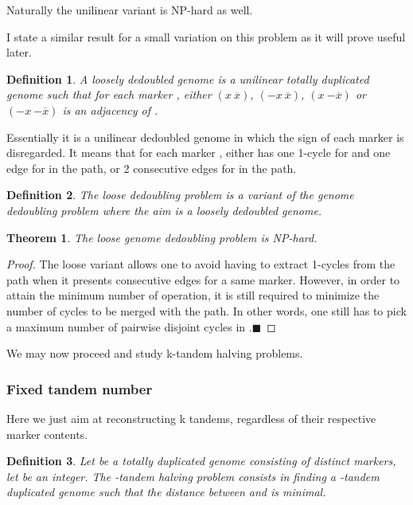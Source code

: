 \documentclass[11pt,final,twoside,nofrench]{thlifl}
\newcommand{\qed}{\ensuremath{\blacksquare}}
\newcommand{\fst}[1]{ \ensuremath{#1} }
\newcommand{\snd}[1]{ \ensuremath{\overline{#1}} }
\newcommand{\msnd}[1]{ \ensuremath{{-\overline{#1}}} }
\newcommand\aff[2]{\ensuremath{(\fst{#1}~\fst{#2})}}
\newcommand\afs[2]{\ensuremath{(\fst{#1}~\snd{#2})}}
\newtheorem{proof}{Proof}
\newtheorem{theorem}{Theorem}
\newtheorem{definition}{Definition}
\begin{document}
{Naturally the unilinear variant is NP-hard as well.

I state a similar result for a small variation on this problem as it will prove useful later.

\begin{definition}
A \emph{loosely dedoubled genome} is a unilinear totally duplicated genome  such that for each marker , either \afs{x}{x}, \afs{-x}{x}, \aff{x}{\msnd{x}} or \aff{-x}{\msnd{x}} is an adjacency of .
\end{definition}

Essentially it is a unilinear dedoubled genome in which the sign of each marker is disregarded. It means that for each marker ,  either has one 1-cycle for  and one edge for  in the path, or 2 consecutive edges for  in the path.

\begin{definition}
The \emph{loose dedoubling problem} is a variant of the genome dedoubling problem where the aim is a loosely dedoubled genome. 
\end{definition}

\begin{theorem}
The loose genome dedoubling problem is NP-hard.
\end{theorem}
\begin{proof}
The loose variant allows one to avoid having to extract 1-cycles from the path when it presents consecutive edges for a same marker. However, in order to attain the minimum number of operation, it is still required to minimize the number of cycles to be merged with the path. In other words, one still has to pick a maximum number of pairwise disjoint cycles in .\qed
\end{proof}

We may now proceed and study k-tandem halving problems.

\subsubsection{Fixed tandem number}

Here we just aim at reconstructing k tandems, regardless of their respective marker contents.

\begin{definition}
    Let  be a totally duplicated genome consisting of  distinct markers, let  be an
    integer. The \emph{-tandem halving} problem consists in finding
    a -tandem duplicated genome  such that the distance between
     and  is minimal.
\end{definition}

}
\end{document}
